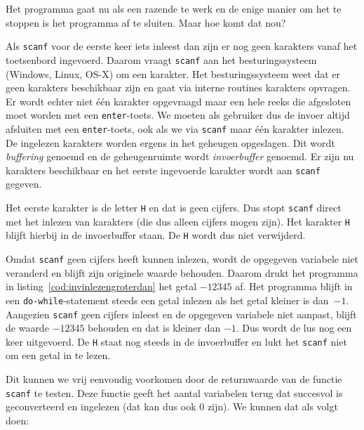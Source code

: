 Het programma gaat nu als een razende te werk en de enige manier om het te stoppen is het programma af te sluiten. Maar hoe komt dat nou?

Als \texttt{scanf} voor de eerste keer iets inleest dan zijn er nog geen karakters vanaf het toetsenbord ingevoerd. Daarom vraagt \texttt{scanf} aan het besturingssysteem (Windows, Linux, OS-X) om een karakter. Het besturingssysteem weet dat er geen karakters beschikbaar zijn en gaat via interne routines karakters opvragen. Er wordt echter niet \'e\'en karakter opgevraagd maar een hele reeks die afgesloten moet worden met een \texttt{enter}-toets. We moeten als gebruiker dus de invoer altijd afsluiten met een \texttt{enter}-toets, ook als we via \texttt{scanf} maar \'e\'en karakter inlezen. De ingelezen karakters worden ergens in het geheugen opgeslagen. Dit wordt \textsl{buffering} genoemd en de geheugenruimte wordt \textsl{invoerbuffer} genoemd. Er zijn nu karakters beschikbaar en het eerste ingevoerde karakter wordt aan \texttt{scanf} gegeven.

Het eerste karakter is de letter \texttt{H} en dat is geen cijfers. Dus stopt \texttt{scanf} direct met het inlezen van karakters (die dus alleen cijfers mogen zijn). Het karakter \texttt{H} blijft hierbij in de invoerbuffer staan. De \texttt{H} wordt dus niet verwijderd.

Omdat \texttt{scanf} geen cijfers heeft kunnen inlezen, wordt de opgegeven variabele niet veranderd en blijft zijn originele waarde behouden. Daarom drukt het programma in listing~\ref{cod:invinlezengroterdan} het getal $-12345$ af. Het programma blijft in een \texttt{do-while}-statement steeds een getal inlezen als het getal kleiner is dan~$-1$. Aangezien \texttt{scanf} geen cijfers inleest en de opgegeven variabele niet aanpast, blijft de waarde $-12345$ behouden en dat is kleiner dan $-1$. Dus wordt de lus nog een keer uitgevoerd. De \texttt{H} staat nog steeds in de invoerbuffer en lukt het \texttt{scanf} niet om een getal in te lezen.

Dit kunnen we vrij eenvoudig voorkomen door de returnwaarde van de functie \texttt{scanf} te testen. Deze functie geeft het aantal variabelen terug dat succesvol is geconverteerd en ingelezen (dat kan dus ook 0 zijn). We kunnen dat als volgt doen:

